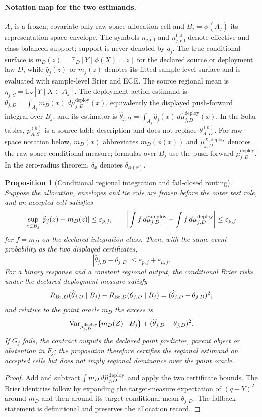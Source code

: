 \documentclass[11pt,a4paper]{article}
\newcommand{\E}{\mathbb E}\newcommand{\Pp}{\mathbb P}
\numberwithin{equation}{section}
\newtheorem{proposition}[theorem]{Proposition}
\theoremstyle{definition}\newtheorem{definition}[theorem]{Definition}
\theoremstyle{remark}\newtheorem{remark}[theorem]{Remark}
\begin{document}
\paragraph{Notation map for the two estimands.}
$A_j$ is a frozen, covariate-only raw-space allocation cell and $B_j=\phi(A_j)$ its representation-space envelope. The symbols $n_{j,\mathrm{eff}}$ and $n_{j,\mathrm{eff}}^{\mathrm{bal}}$ denote effective and class-balanced support; support is never denoted by $q_j$. The true conditional surface is $m_D(z)=\E_D[Y\mid\phi(X)=z]$ for the declared source or deployment law $D$, while $\widehat q_j(z)$ or $\widehat m_j(z)$ denotes its fitted sample-level surface and is evaluated with sample-level Brier and ECE. The source regional mean is $\eta_{j,S}=\E_S[Y\mid X\in A_j]$. The deployment action estimand is $\theta_{j,D}=\int_{A_j}m_D(x)\,d\mu_{j,D}^{\mathrm{deploy}}(x)$, equivalently the displayed push-forward integral over $B_j$, and its estimator is $\widehat\theta_{j,D}=\int_{A_j}\widehat q_j(x)\,d\widehat\mu_{j,D}^{\mathrm{deploy}}(x)$. In the Solar tables, $p_{A,S}^{(h)}$ is a source-table description and does not replace $\theta_{A,D}^{(h)}$. For raw-space notation below, $m_D(x)$ abbreviates $m_D(\phi(x))$ and $\mu_{j,D}^{X,\mathrm{deploy}}$ denotes the raw-space conditional measure; formulas over $B_j$ use the push-forward $\mu_{j,D}^{\mathrm{deploy}}$. In the zero-radius theorem, $\delta_x$ denotes $\delta_{\phi(x)}$.

\begin{proposition}[Conditional regional integration and fail-closed routing]\label{prop:regionalcontract}
Suppose the allocation, envelopes and tie rule are frozen before the outer test role, and an accepted cell satisfies
\[
\sup_{z\in B_j}|\widehat p_j(z)-m_D(z)|\le\varepsilon_{p,j},
\qquad
\left|\int f\,d\widehat\mu_{j,D}^{\rm deploy}-\int f\,d\mu_{j,D}^{\rm deploy}\right|\le\varepsilon_{\mu,j}
\]
for $f=m_D$ on the declared integration class. Then, with the same event probability as the two displayed certificates,
\[
|\widehat\theta_{j,D}-\theta_{j,D}|\le\varepsilon_{p,j}+\varepsilon_{\mu,j}.
\]
For a binary response and a constant regional output, the conditional Brier risks under the declared deployment measure satisfy
\[
R_{{\rm Br},D}(\widehat\theta_{j,D}\mid B_j)-R_{{\rm Br},D}(\theta_{j,D}\mid B_j)
=(\widehat\theta_{j,D}-\theta_{j,D})^2,
\]
and relative to the point oracle $m_D$ the excess is
\[
\operatorname{Var}_{\mu_{j,D}^{\rm deploy}}\{m_D(Z)\mid B_j\}+(\widehat\theta_{j,D}-\theta_{j,D})^2.
\]
If $G_j$ fails, the contract outputs the declared point predictor, parent object or abstention in $F_j$; the proposition therefore certifies the regional estimand on accepted cells but does not imply regional dominance over the point oracle.
\end{proposition}
\begin{proof}
Add and subtract $\int m_D\,d\widehat\mu_{j,D}^{\rm deploy}$ and apply the two certificate bounds. The Brier identities follow by expanding the target-measure expectation of $(q-Y)^2$ around $m_D$ and then around its target conditional mean $\theta_{j,D}$. The fallback statement is definitional and preserves the allocation record.
\end{proof}
\end{document}
